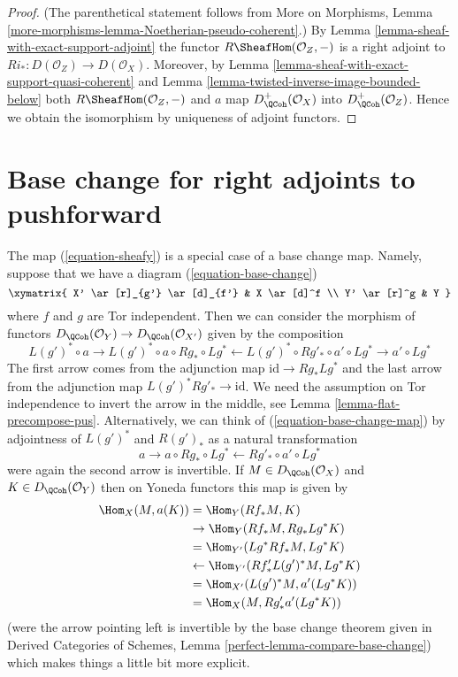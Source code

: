 \begin{proof}
(The parenthetical statement follows from More on Morphisms, Lemma
\ref{more-morphisms-lemma-Noetherian-pseudo-coherent}.)
By Lemma \ref{lemma-sheaf-with-exact-support-adjoint}
the functor $R\SheafHom(\mathcal{O}_Z, -)$ is a right adjoint
to $Ri_* : D(\mathcal{O}_Z) \to D(\mathcal{O}_X)$. Moreover,
by Lemma \ref{lemma-sheaf-with-exact-support-quasi-coherent}
and Lemma \ref{lemma-twisted-inverse-image-bounded-below}
both $R\SheafHom(\mathcal{O}_Z, -)$ and $a$ map
$D_\QCoh^+(\mathcal{O}_X)$ into $D_\QCoh^+(\mathcal{O}_Z)$.
Hence we obtain the isomorphism by uniqueness of adjoint
functors.
\end{proof}






\section{Base change for right adjoints to pushforward}
\label{section-base-change-map}

\noindent
The map (\ref{equation-sheafy}) is a special case of a base change map.
Namely, suppose that we have a diagram (\ref{equation-base-change})
$$
\xymatrix{
X' \ar[r]_{g'} \ar[d]_{f'} & X \ar[d]^f \\
Y' \ar[r]^g & Y
}
$$
where $f$ and $g$ are Tor independent. Then we can consider the
morphism of functors
$D_\QCoh(\mathcal{O}_Y) \to D_\QCoh(\mathcal{O}_{X'})$
given by the composition
\begin{equation}
\label{equation-base-change-map}
L(g')^* \circ a \to
L(g')^* \circ a \circ Rg_* \circ Lg^* \leftarrow
L(g')^* \circ Rg'_* \circ a' \circ Lg^* \to a' \circ Lg^*
\end{equation}
The first arrow comes from the adjunction map $\text{id} \to Rg_* Lg^*$
and the last arrow from the adjunction map $L(g')^*Rg'_* \to \text{id}$.
We need the assumption on Tor independence to invert the arrow
in the middle, see Lemma \ref{lemma-flat-precompose-pus}.
Alternatively, we can think of (\ref{equation-base-change-map}) by
adjointness of $L(g')^*$ and $R(g')_*$ as a natural transformation
$$
a \to a \circ Rg_* \circ Lg^* \leftarrow Rg'_* \circ a' \circ Lg^*
$$
were again the second arrow is invertible. If $M \in D_\QCoh(\mathcal{O}_X)$
and $K \in D_\QCoh(\mathcal{O}_Y)$
then on Yoneda functors this map is given by
\begin{align*}
\Hom_X(M, a(K))
& =
\Hom_Y(Rf_*M, K) \\
& \to
\Hom_Y(Rf_*M, Rg_* Lg^*K) \\
& =
\Hom_{Y'}(Lg^*Rf_*M, Lg^*K) \\
& \leftarrow
\Hom_{Y'}(Rf'_* L(g')^*M, Lg^*K) \\
& =
\Hom_{X'}(L(g')^*M, a'(Lg^*K)) \\
& =
\Hom_X(M, Rg'_*a'(Lg^*K))
\end{align*}
(were the arrow pointing left is invertible by the base
change theorem given in
Derived Categories of Schemes, Lemma \ref{perfect-lemma-compare-base-change})
which makes things a little bit more explicit.

